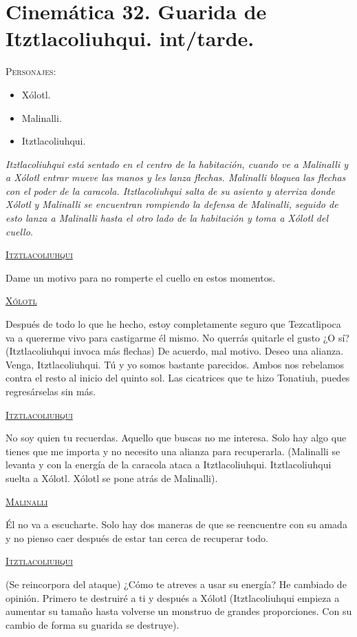 \documentclass[11pt,letterpaper]{article}
\begin{document}
\section{Cinemática 32. Guarida de Itztlacoliuhqui. int/tarde.}
 \textsc{Personajes}:
 \begin{itemize}
 \item Xólotl.
 \item Malinalli.
 \item Itztlacoliuhqui.
 \end{itemize}
\textit{Itztlacoliuhqui está sentado en el centro de la habitación, cuando ve a Malinalli y a Xólotl entrar mueve las manos y les lanza flechas. Malinalli bloquea las flechas con el poder de la caracola. Itztlacoliuhqui salta de su asiento y aterriza donde Xólotl y Malinalli se encuentran rompiendo la defensa de Malinalli, seguido de esto lanza a Malinalli hasta el otro lado de la habitación y toma a Xólotl del cuello.}
\begin{center}
\textsc{\underline{Itztlacoliuhqui}}
\\
\par
Dame un motivo para no romperte el cuello en estos momentos.
\\
\par
\textsc{\underline{Xólotl}}
\\
\par
Después de todo lo que he hecho, estoy completamente seguro que Tezcatlipoca va a quererme vivo para castigarme él mismo. No querrás quitarle el gusto ¿O sí?  (Itztlacoliuhqui invoca más flechas) De acuerdo, mal motivo. Deseo una alianza. Venga, Itztlacoliuhqui. Tú y yo somos bastante parecidos. Ambos nos rebelamos contra el resto al inicio del quinto sol. Las cicatrices que te hizo Tonatiuh, puedes regresárselas sin más.
\\
\par
\textsc{\underline{Itztlacoliuhqui}}
\\
\par
No soy quien tu recuerdas. Aquello que buscas no me interesa. Solo hay algo que tienes que me importa y no necesito una alianza para recuperarla. (Malinalli se levanta y con la energía de la caracola ataca a Itztlacoliuhqui. Itztlacoliuhqui suelta a Xólotl. Xólotl se pone atrás de Malinalli).
\\
\par
\textsc{\underline{Malinalli}}
\\
\par
Él no va a escucharte. Solo hay dos maneras de que se reencuentre con su amada y no pienso caer después de estar tan cerca de recuperar todo.
\\
\par
\textsc{\underline{Itztlacoliuhqui}}
\\
\par
(Se reincorpora del ataque) ¿Cómo te atreves a usar su energía? He cambiado de opinión. Primero te destruiré a ti y después a Xólotl (Itztlacoliuhqui empieza a aumentar su tamaño hasta volverse un monstruo de grandes proporciones. Con su cambio de forma su guarida se destruye).
\end{center}
\end{document}
